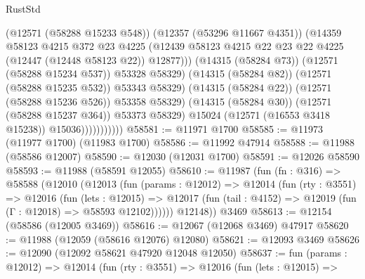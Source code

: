 \begin{lexlean}{RustStd}
\begin{coremodule}
                                    (@12571 (@58288 @15233 @548))
                                    (@12357 (@53296 @11667 @4351))
                                    (@14359
                                      @58123
                                      @4215
                                      @372
                                      @23
                                      @4225
                                      (@12439
                                        @58123
                                        @4215
                                        @22
                                        @23
                                        @22
                                        @4225
                                        (@12447 (@12448 @58123 @22))
                                        @12877)))
                                  (@14315 (@58284 @73))
                                  (@12571 (@58288 @15234 @537))
                                  @53328
                                  @58329)
                                (@14315 (@58284 @82))
                                (@12571 (@58288 @15235 @532))
                                @53343
                                @58329)
                              (@14315 (@58284 @22))
                              (@12571 (@58288 @15236 @526))
                              @53358
                              @58329)
                            (@14315 (@58284 @30))
                            (@12571 (@58288 @15237 @364))
                            @53373
                            @58329)
                          @15024
                          (@12571 (@16553 @3418 @15238))
                          @15036)))))))))))
@58581 := @11971 @1700
@58585 := @11973 (@11977 @1700) (@11983 @1700)
@58586 := @11992 @47914
@58588 := @11988 (@58586 @12007)
@58590 := @12030 (@12031 @1700)
@58591 := @12026 @58590
@58593 := @11988 (@58591 @12055)
@58610 := @11987
    (fun (fn : @316) =>
    @58588
      (@12010
        (@12013
          (fun (params : @12012) =>
          @12014
            (fun (rty : @3551) =>
            @12016
              (fun (lets : @12015) =>
              @12017 (fun (tail : @4152) => @12019 (fun (Γ : @12018) => @58593 @12102))))))
        @12148))
    @3469
@58613 := @12154 (@58586 (@12005 @3469))
@58616 := @12067 (@12068 @3469) @47917
@58620 := @11988 (@12059 (@58616 @12076) @12080)
@58621 := @12093 @3469
@58626 := @12090 (@12092 @58621 @47920 @12048 @12050)
@58637 := fun (params : @12012) =>
  @12014
    (fun (rty : @3551) =>
    @12016
      (fun (lets : @12015) =>

\end{coremodule}
\end{lexlean}
